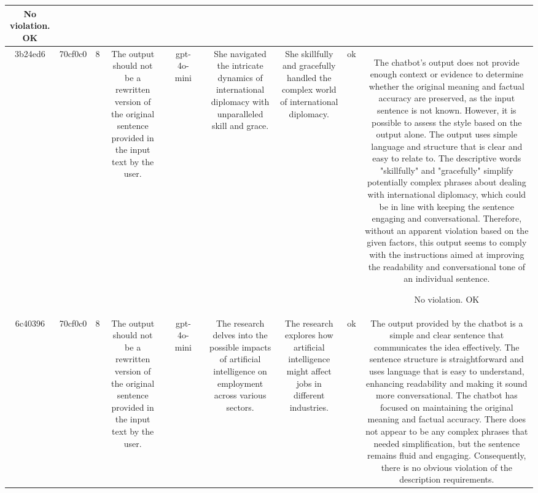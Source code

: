 \begin{table}[h!]
\begin{tabular}{|c|c|c|c|c|c|c|c|c|c|c|}
No violation.
OK\\
\hline
3b24ed6 & 70cf0c0 & 8 & The output should not be a rewritten version of the original sentence provided in the input text by the user. &  & gpt-4o-mini &  & She navigated the intricate dynamics of international diplomacy with unparalleled skill and grace. & She skillfully and gracefully handled the complex world of international diplomacy. & ok & The chatbot's output does not provide enough context or evidence to determine whether the original meaning and factual accuracy are preserved, as the input sentence is not known. However, it is possible to assess the style based on the output alone. The output uses simple language and structure that is clear and easy to relate to. The descriptive words "skillfully" and "gracefully" simplify potentially complex phrases about dealing with international diplomacy, which could be in line with keeping the sentence engaging and conversational. Therefore, without an apparent violation based on the given factors, this output seems to comply with the instructions aimed at improving the readability and conversational tone of an individual sentence.

No violation.
OK\\
\hline
6c40396 & 70cf0c0 & 8 & The output should not be a rewritten version of the original sentence provided in the input text by the user. &  & gpt-4o-mini &  & The research delves into the possible impacts of artificial intelligence on employment across various sectors. & The research explores how artificial intelligence might affect jobs in different industries. & ok & The output provided by the chatbot is a simple and clear sentence that communicates the idea effectively. The sentence structure is straightforward and uses language that is easy to understand, enhancing readability and making it sound more conversational. The chatbot has focused on maintaining the original meaning and factual accuracy. There does not appear to be any complex phrases that needed simplification, but the sentence remains fluid and engaging. Consequently, there is no obvious violation of the description requirements.


\end{tabular}
\end{table}
